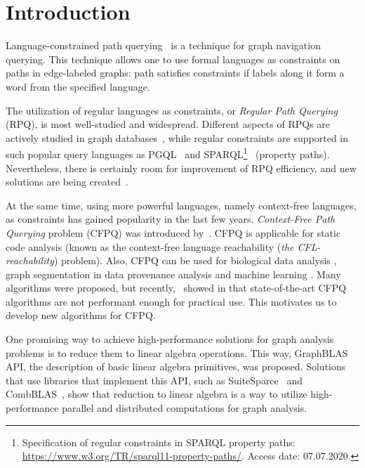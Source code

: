 \section{Introduction}


Language-constrained path querying~\citep{barrett2000formal} is a technique for graph navigation querying.
This technique allows one to use formal languages as constraints on paths in edge-labeled graphs: path satisfies constraints if labels along it form a word from the specified language.

The utilization of regular languages as constraints, or \textit{Regular Path Querying} (RPQ), is most well-studied and widespread.
Different aspects of RPQs are actively studied in graph databases~\citep{10.1145/2463664.2465216, 10.1145/3104031,10.1145/2850413}, while regular constraints are supported in such popular query languages as PGQL~\citep{10.1145/2960414.2960421} and SPARQL\footnote{Specification of regular constraints in SPARQL property paths: \url{https://www.w3.org/TR/sparql11-property-paths/}. Access date: 07.07.2020.}~\citep{10.1007/978-3-319-25007-6_1} (property paths).
Nevertheless, there is certainly room for improvement of RPQ efficiency, and new solutions are being created~\citep{Wang2019,10.1145/2949689.2949711}.

At the same time, using more powerful languages, namely context-free languages, as constraints has gained popularity in the last few years.
\textit{Context-Free Path Querying} problem (CFPQ) was introduced by~\cite{Yannakakis}. CFPQ is applicable for static code analysis \citep{10.1145/3158118,10.5555/271338.271343, YanSCA, Zheng:2008:DAA:1328897.1328464} (known as the context-free language reachability (\textit{the CFL-reachability}) problem). Also, CFPQ can be used for biological data analysis \citep{GraphQueryWithEarley}, graph segmentation in data provenance analysis \citep{8731467} and machine learning \citep{10.1145/3428301}. 
Many algorithms were proposed, but recently,~\cite{Kuijpers:2019:ESC:3335783.3335791} showed in that state-of-the-art CFPQ algorithms are not performant enough for practical use. 
This motivates us to develop new algorithms for CFPQ.

One promising way to achieve high-performance solutions for graph analysis problems is to reduce them to linear algebra operations.
This way, GraphBLAS~\citep{7761646} API, the description of basic linear algebra primitives, was proposed.
Solutions that use libraries that implement this API, such as SuiteSparce~\citep{10.1145/3322125} and CombBLAS~\citep{10.1177/1094342011403516}, show that reduction to linear algebra is a way to utilize high-performance parallel and distributed computations for graph analysis.

